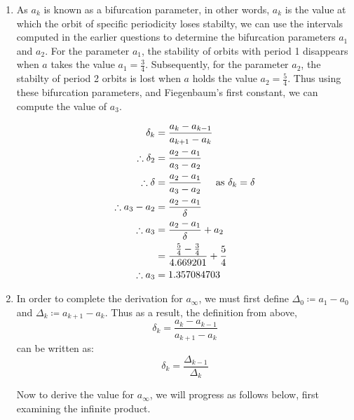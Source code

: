 \documentclass[a4paper]{article}
\begin{document}
\begin{enumerate}[label=\textbf{\arabic*.}]
\begin{enumerate}
		\pagebreak

		\item As $a_k$ is known as a bifurcation parameter, in other words, $a_k$ is the value at which the orbit of specific periodicity loses stabilty, we can use the intervals computed in the earlier questions to determine the bifurcation parameters $a_1$ and $a_2$. For the parameter $a_1$, the stability of orbits with period 1 disappears when $a$ takes the value $a_1 = \frac{3}{4}$. Subsequently, for the parameter $a_2$, the stabilty of period 2 orbits is lost when $a$ holds the value $a_2 = \frac{5}{4}$. Thus using these bifurcation parameters, and Fiegenbaum's first constant, we can compute the value of $a_3$.

		\begin{align*}
		\delta_k & = \frac{a_k - a_{k-1}}{a_{k+1}-a_k}\\
		\therefore \delta_2 & = \frac{a_2 - a_{1}}{a_{3}-a_2}\\
		\therefore \delta & = \frac{a_2 - a_{1}}{a_{3}-a_2} \hspace{5mm} \text{as } \delta_k = \delta\\
		\therefore a_{3}-a_2 & = \frac{a_2 - a_{1}}{\delta}\\
		\therefore a_3 & = \frac{a_2 - a_{1}}{\delta} + a_2\\
		& = \frac{\frac{5}{4} - \frac{3}{4}}{4.669201} + \frac{5}{4}\\
		\therefore a_3 & = 1.357084703\\
		\end{align*}

		\item In order to complete the derivation for $a_{\infty}$, we must first define $\displaystyle{\Delta_0 \coloneqq a_1 - a_0}$ and $\displaystyle{\Delta_k \coloneqq a_{k+1} - a_{k}}$. Thus as a result, the definition from above,
		$$\delta_k = \frac{a_k - a_{k-1}}{a_{k+1}-a_k}$$
		can be written as:
		$$\delta_k = \frac{\Delta_{k-1}}{\Delta_{k}}$$

		

		Now to derive the value for $a_{\infty}$, we will progress as follows below, first examining the infinite product.


\end{enumerate}
\end{enumerate}
\end{document}
